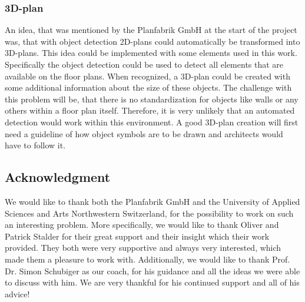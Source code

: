 \subsubsection{3D-plan}
An idea, that was mentioned by the Planfabrik GmbH at the start of the project was, that with object detection 2D-plans could automatically be transformed into 3D-plans. This idea could be implemented with some elements used in this work. Specifically the object detection could be used to detect all elements that are available on the floor plans. When recognized, a 3D-plan could be created with some additional information about the size of these objects. The challenge with this problem will be, that there is no standardization for objects like walls or any others within a floor plan itself. Therefore, it is very unlikely that an automated detection would work within this environment. A good 3D-plan creation will first need a guideline of how object symbols are to be drawn and architects would have to follow it.


\subsection{Acknowledgment}
We would like to thank both the Planfabrik GmbH and the University of Applied Sciences and Arts Northwestern Switzerland, for the possibility to work on such an interesting problem. More specifically, we would like to thank Oliver and Patrick Stalder for their great support and their insight which their work provided. They both were very supportive and always very interested, which made them a pleasure to work with. Additionally, we would like to thank Prof. Dr. Simon Schubiger as our coach, for his guidance and all the ideas we were able to discuss with him. We are very thankful for his continued support and all of his advice!
